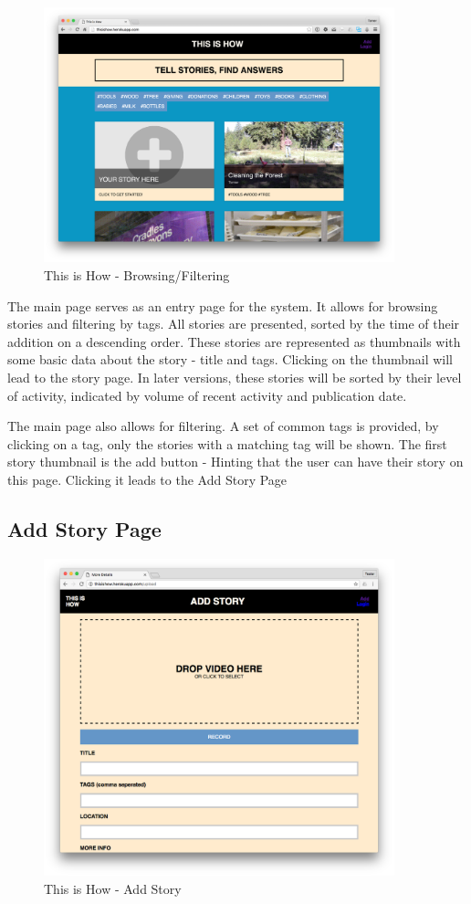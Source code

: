    \begin{figure}[thpb]
      \centering
      \includegraphics[width=4in]{figures/mainpage.png}
      \caption{This is How - Browsing/Filtering}
      \label{fig_main_page}
   \end{figure}

The main page serves as an entry page for the system. It allows for browsing stories and filtering by tags. All stories are presented, sorted by the time of their addition on a descending order. These stories are represented as thumbnails with some basic data about the story - title and tags. Clicking on the thumbnail will lead to the story page. In later versions, these stories will be sorted by their level of activity, indicated by volume of recent activity and publication date. 

The main page also allows for filtering. A set of common tags is provided, by clicking on a tag, only the stories with a matching tag will be shown. The first story thumbnail is the add button - Hinting that the user can have their story on this page. Clicking it leads to the Add Story Page

\subsection{Add Story Page}

   \begin{figure}[thpb]
      \centering
      \includegraphics[width=4in]{figures/addstory.png}
      \caption{This is How - Add Story}
      \label{fig_add_story}
   \end{figure}

